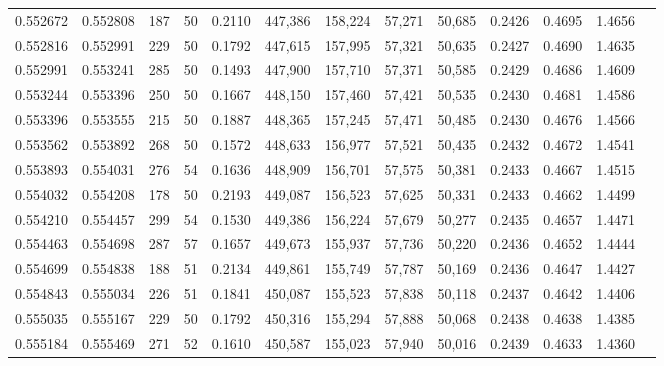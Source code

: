 \begin{tabular}{rrrrrrrrrrrrr}
0.552672 & 0.552808 &   187 &  50 &                                     0.2110 & 447,386 & 158,224 &  57,271 &  50,685 & 0.2426 & 0.4695 & 1.4656 \\
0.552816 & 0.552991 &   229 &  50 &                                     0.1792 & 447,615 & 157,995 &  57,321 &  50,635 & 0.2427 & 0.4690 & 1.4635 \\
0.552991 & 0.553241 &   285 &  50 &                                     0.1493 & 447,900 & 157,710 &  57,371 &  50,585 & 0.2429 & 0.4686 & 1.4609 \\
0.553244 & 0.553396 &   250 &  50 &                                     0.1667 & 448,150 & 157,460 &  57,421 &  50,535 & 0.2430 & 0.4681 & 1.4586 \\
0.553396 & 0.553555 &   215 &  50 &                                     0.1887 & 448,365 & 157,245 &  57,471 &  50,485 & 0.2430 & 0.4676 & 1.4566 \\
0.553562 & 0.553892 &   268 &  50 &                                     0.1572 & 448,633 & 156,977 &  57,521 &  50,435 & 0.2432 & 0.4672 & 1.4541 \\
0.553893 & 0.554031 &   276 &  54 &                                     0.1636 & 448,909 & 156,701 &  57,575 &  50,381 & 0.2433 & 0.4667 & 1.4515 \\
0.554032 & 0.554208 &   178 &  50 &                                     0.2193 & 449,087 & 156,523 &  57,625 &  50,331 & 0.2433 & 0.4662 & 1.4499 \\
0.554210 & 0.554457 &   299 &  54 &                                     0.1530 & 449,386 & 156,224 &  57,679 &  50,277 & 0.2435 & 0.4657 & 1.4471 \\
0.554463 & 0.554698 &   287 &  57 &                                     0.1657 & 449,673 & 155,937 &  57,736 &  50,220 & 0.2436 & 0.4652 & 1.4444 \\
0.554699 & 0.554838 &   188 &  51 &                                     0.2134 & 449,861 & 155,749 &  57,787 &  50,169 & 0.2436 & 0.4647 & 1.4427 \\
0.554843 & 0.555034 &   226 &  51 &                                     0.1841 & 450,087 & 155,523 &  57,838 &  50,118 & 0.2437 & 0.4642 & 1.4406 \\
0.555035 & 0.555167 &   229 &  50 &                                     0.1792 & 450,316 & 155,294 &  57,888 &  50,068 & 0.2438 & 0.4638 & 1.4385 \\
0.555184 & 0.555469 &   271 &  52 &                                     0.1610 & 450,587 & 155,023 &  57,940 &  50,016 & 0.2439 & 0.4633 & 1.4360 \\

\end{tabular}

